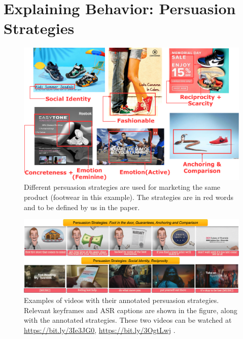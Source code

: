 \documentclass[hidelinks,11pt,a4paper]{report}
\begin{document}

\chapter{Explaining Behavior: Persuasion Strategies}
\label{chatper:Explaining Behavior: Persuasion Strategies}


\begin{figure}[t]
    \centering
    \includegraphics[scale=0.08]{images/footwear-strategies.pdf}
    \caption{Different persuasion strategies are used for marketing the same product (footwear in this example). The strategies are in red words and to be defined by us in the paper.}
    \label{fig:footwear-strategies}
\end{figure}


\begin{figure}[!ht]
    \centering
    \includegraphics[width=\textwidth]{images/persuasion-strategies-videos.png}
    \caption{Examples of videos with their annotated persuasion strategies. Relevant keyframes and ASR captions are shown in the figure, along with the annotated strategies. These two videos can be watched at 
    \url{https://bit.ly/3Ie3JG0}, \url{https://bit.ly/3OgtLwj}
    .}
    \label{fig:persuasion-strategy-dataset-examples}
\end{figure}
\end{document}

